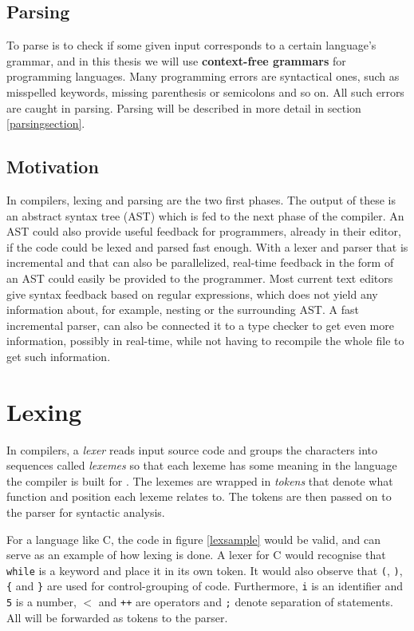 \documentclass[a4paper,12pt,notitlepage]{report}
\renewcommand\cite{\citep}
\begin{document}
\subsection{Parsing}
To parse is to check if some given input corresponds to a certain language's
grammar, and in this thesis we will use \textbf{context-free grammars} for
programming languages. Many programming errors are syntactical ones, such as
misspelled keywords, missing parenthesis or semicolons and so on. All such
errors are caught in parsing. Parsing will be described in more detail in
section \ref{parsingsection}.

\subsection{Motivation}
In compilers, lexing and parsing are the two first phases. The output of these
is an abstract syntax tree (AST) which is fed to the next phase of the compiler.
An AST could also provide useful feedback for programmers, already in their
editor, if the code could be lexed and parsed fast enough. With a lexer and
parser that is incremental and that can also be parallelized, real-time feedback
in the form of an AST could easily be provided to the programmer. Most current
text editors give syntax feedback based on regular expressions, which does not
yield any information about, for example, nesting or the surrounding AST. A
fast incremental parser, can also be connected it to a type checker to get even
more information, possibly in real-time, while not having to recompile the whole
file to get such information.

\section{Lexing}
In compilers, a \textit{lexer} reads input source code and groups the characters
into sequences called \textit{lexemes} so that each lexeme has some meaning in
the language the compiler is built for \cite[p. 5, p. 109]{dragonbook}. The
lexemes are wrapped in \textit{tokens} that denote what function and position
each lexeme relates to. The tokens are then passed on to the parser for
syntactic analysis.

For a language like C, the code in figure \ref{lexsample} would be valid, and
can serve as an example of how lexing is done.  A lexer for C would recognise
that \texttt{while} is a keyword and place it in its own token. It would also
observe that \texttt{(}, \texttt{)}, \texttt{\{} and \texttt{\}} are used for
control-grouping of code. Furthermore, \texttt{i} is an identifier and
\texttt{5} is a number, \texttt{$<$} and \texttt{++} are operators and
\texttt{;} denote separation of statements. All will be forwarded as tokens to
the parser.
\end{document}
